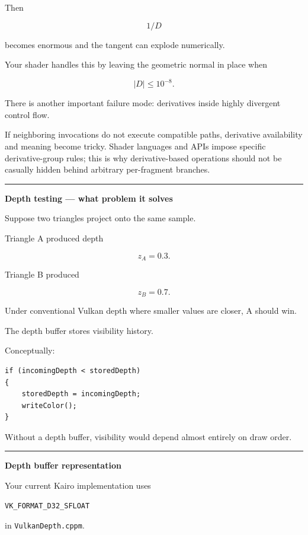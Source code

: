 Then

\[
1/D
\]

becomes enormous and the tangent can explode numerically.

Your shader handles this by leaving the geometric normal in place when

\[
|D|\le10^{-8}.
\]

There is another important failure mode: derivatives inside highly divergent control flow.

If neighboring invocations do not execute compatible paths, derivative availability and meaning become tricky. Shader languages and APIs impose specific derivative-group rules; this is why derivative-based operations should not be casually hidden behind arbitrary per-fragment branches.

\begin{center}\rule{0.5\linewidth}{0.5pt}\end{center}

\textbf{Depth testing --- what problem it solves}

Suppose two triangles project onto the same sample.

Triangle A produced depth

\[
z_A=0.3.
\]

Triangle B produced

\[
z_B=0.7.
\]

Under conventional Vulkan depth where smaller values are closer, A should win.

The depth buffer stores visibility history.

Conceptually:

\begin{verbatim}
if (incomingDepth < storedDepth)
{
    storedDepth = incomingDepth;
    writeColor();
}
\end{verbatim}

Without a depth buffer, visibility would depend almost entirely on draw order.

\begin{center}\rule{0.5\linewidth}{0.5pt}\end{center}

\textbf{Depth buffer representation}

Your current Kairo implementation uses

\begin{verbatim}
VK_FORMAT_D32_SFLOAT
\end{verbatim}

in \texttt{VulkanDepth.cppm}.

